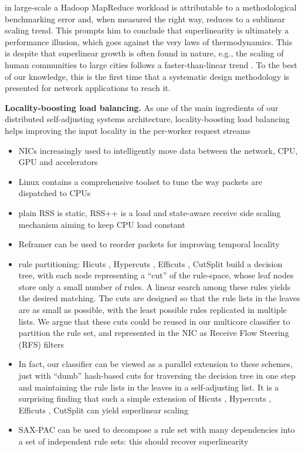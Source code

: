 in large-scale a Hadoop MapReduce workload is attributable to a methodological benchmarking error and, when measured the right way, reduces to a sublinear scaling trend. This prompts him to conclude that superlinearity is ultimately a performance illusion, which goes against the very laws of thermodynamics. This is despite that superlinear growth is often found in nature, e.g., the scaling of human communities to large cities follows a faster-than-linear trend \cite{PhysRevE.79.016115}. To the best of our knowledge, this is the first time that a systematic design methodology is presented for network applications to reach it.

\noindent%
\textbf{Locality-boosting load balancing.} %
As one of the main ingredients of our distributed self-adjusting systems architecture, locality-boosting load balancing helps improving the input locality in the per-worker request streams 

\begin{itemize}
\item NICs increasingly used to intelligently move data between the network, CPU, GPU and accelerators \cite{sherry-ccr23}
\item Linux contains a comprehensive toolset to tune the way packets are dispatched to CPUs \cite{rss-linux}
\item plain RSS is static, RSS++ is a load and state-aware receive side scaling mechanism aiming to keep CPU load constant \cite{10.1145/3359989.3365412}
\item Reframer can be used to reorder packets for improving temporal locality \cite{276946,246322}
\item rule partitioning: Hicuts \cite{820051}, Hypercuts \cite{10.1145/863955.863980}, Efficuts \cite{10.1145/1851182.1851208}, CutSplit \cite{8485947} build a decision tree, with each node representing a ``cut'' of the rule-space, whose leaf nodes store only a small number of rules. A linear search among these rules yields the desired matching. The cuts are designed so that the rule lists in the leaves are as small as possible, with the least possible rules replicated in multiple lists. We argue that these cuts could be reused in our multicore classifier to partition the rule set, and represented in the NIC as Receive Flow Steering (RFS) filters
\item In fact, our classifier can be viewed as a parallel extension to these schemes, just with ``dumb'' hash-based cuts for traversing the decision tree in one step and maintaining the rule lists in the leaves in a self-adjusting list. It is a surprising finding that such a simple extension of Hicuts \cite{820051}, Hypercuts \cite{10.1145/863955.863980}, Efficuts \cite{10.1145/1851182.1851208}, CutSplit \cite{8485947} can yield superlinear scaling
\item SAX-PAC \cite{10.1145/2619239.2626294} can be used to decompose a rule set with many dependencies into a set of independent rule sets: this should recover superlinearity
\end{itemize}

